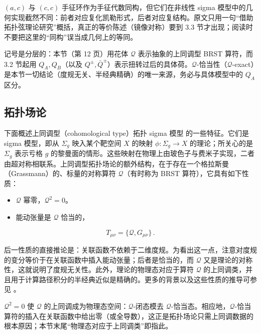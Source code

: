 \begin{yizhu}[含糊点]
$(a,c)$ 与 $(c,c)$ 手征环作为手征代数同构，但它们在非线性 sigma 模型中的几何实现截然不同：前者对应复化凯勒形式，后者对应复结构。原文只用一句“借助拓扑弦理论研究”概括，真正的等价陈述（镜像对称）要到 3.3 节才出现；阅读时不要把这里的“同构”误当成几何上的等同。
\end{yizhu}

\begin{yizhu}[易错点]
记号是分层的：本节（第 12 页）用花体 $\mathcal{Q}$ 表示抽象的上同调型 BRST 算符，而 3.2 节起用 $Q_A,Q_B$（以及 $Q^{\pm},\bar Q^{\pm}$）表示扭转过后的具体荷。$\mathcal{Q}$-恰当性（$\mathcal{Q}$-exact）是本节一切结论（度规无关、半经典精确）的唯一来源，务必与具体模型中的 $Q_A$ 区分。
\end{yizhu}

\subsection{拓扑场论}
\label{sec:3.1}

下面概述上同调型（cohomological type）拓扑 sigma 模型 \cite{ref35} 的一些特征。它们是 sigma 模型，即从 $\Sigma_g$ 映入某个靶空间 $X$ 的映射 $\phi:\Sigma_g\to X$ 的理论；所关心的是 $\Sigma_g$ 表示亏格 $g$ 的黎曼面的情形。这些映射在物理上由玻色子与费米子实现，二者由超对称相联系。上同调型拓扑场论的额外结构，在于存在一个格拉斯曼（Grassmann）的、标量的对称算符 $\mathcal{Q}$（有时称为 BRST 算符），它具有如下性质：
\begin{itemize}[leftmargin=1.4em,itemsep=1pt,topsep=2pt]
  \item $\mathcal{Q}$ 幂零，$\mathcal{Q}^2=0$。
  \item 能动张量是 $\mathcal{Q}$ 恰当的，
\end{itemize}
\[
T_{\mu\nu}=\{\mathcal{Q},G_{\mu\nu}\}\,.
\]

后一性质的直接推论是：关联函数不依赖于二维度规。为看出这一点，注意对度规的变分等价于在关联函数中插入能动张量；后者是恰当的，而 $\mathcal{Q}$ 又是理论的对称性，这就说明了度规无关性。此外，理论的物理态对应于算符 $\mathcal{Q}$ 的上同调类，并且用于计算路径积分的半经典近似是精确的。更多的背景以及这些性质的推导可参见 \cite{ref36,ref9}。

\begin{yizhu}[物理图像]
$\mathcal{Q}^2=0$ 使 $\mathcal{Q}$ 的上同调成为物理态空间：$\mathcal{Q}$-闭态模去 $\mathcal{Q}$-恰当态。相应地，$\mathcal{Q}$-恰当算符的插入在关联函数中给出零（或全导数），这正是拓扑场论只需上同调数据的根本原因；本节末尾“物理态对应于上同调类”即指此。
\end{yizhu}

